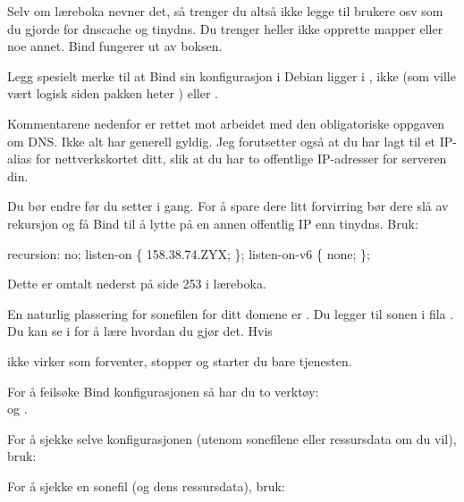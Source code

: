 \begin{remark}
Selv om læreboka nevner det, så trenger du altså ikke legge til brukere osv 
som du gjorde for dnscache og tinydns. Du trenger heller ikke opprette mapper eller noe annet.
Bind fungerer ut av boksen.
\end{remark}

Legg spesielt merke til at Bind sin konfigurasjon i Debian ligger i , 
ikke  (som ville vært logisk siden pakken heter ) 
eller . 

Kommentarene nedenfor er rettet mot arbeidet med den obligatoriske oppgaven
om DNS. Ikke alt har generell gyldig. Jeg forutsetter også at du har lagt
til et IP-alias for nettverkskortet ditt, slik at du har to offentlige IP-adresser
for serveren din. 

Du bør endre  før du setter i gang.
For å spare dere litt forvirring bør dere slå av rekursjon og få Bind til å lytte 
på en annen offentlig IP enn tinydns. Bruk:

\begin{filedata}
recursion: no;
listen-on \{ 158.38.74.ZYX; \};
listen-on-v6 \{ none; \};
\end{filedata}

Dette er omtalt nederst på side 253 i læreboka. 

En naturlig plassering for sonefilen for ditt domene er 
.  
Du legger til sonen i fila . 
Du kan se i  for 
å lære hvordan du gjør det. Hvis 


ikke virker som forventer, stopper og starter du bare tjenesten.

For å feilsøke Bind konfigurasjonen så har du to verktøy: \\ 
 og .

For å sjekke selve konfigurasjonen (utenom sonefilene eller ressursdata om du vil), bruk:


For å sjekke en sonefil (og dens ressursdata), bruk:


